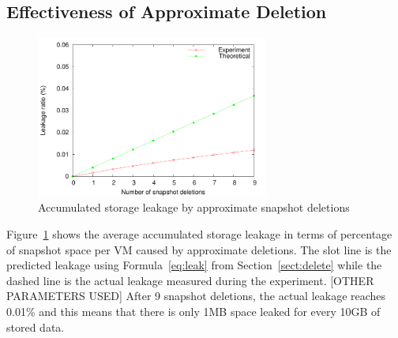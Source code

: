 \subsection{Effectiveness of Approximate Deletion}

\begin{figure}
    \centering
    \includegraphics[width=3in]{figures/leakage}
    \caption{Accumulated storage leakage by approximate snapshot deletions}
    \label{fig:leakage}
\end{figure}

Figure~\ref{fig:leakage} shows the average accumulated storage leakage in terms of percentage of
snapshot space per VM caused  by approximate deletions.
The slot line is the predicted leakage using Formula~\ref{eq:leak} from Section~\ref{sect:delete}
while the dashed line is the actual leakage measured during the experiment.
[OTHER PARAMETERS USED]
After 9 snapshot deletions, the actual leakage reaches 0.01\% and this means that
there is only 1MB space leaked for every 10GB of stored data. 
  

